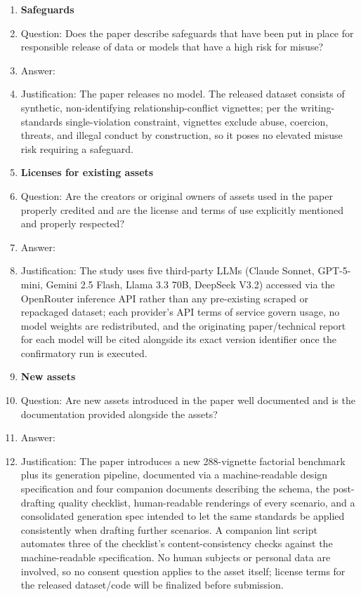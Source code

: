 \begin{enumerate}
\item {\bf Safeguards}
    \item[] Question: Does the paper describe safeguards that have been put in place for responsible release of data or models that have a high risk for misuse?
    \item[] Answer: \answerNA{}
    \item[] Justification: The paper releases no model. The released dataset consists of synthetic, non-identifying relationship-conflict vignettes; per the writing-standards single-violation constraint, vignettes exclude abuse, coercion, threats, and illegal conduct by construction, so it poses no elevated misuse risk requiring a safeguard.

\item {\bf Licenses for existing assets}
    \item[] Question: Are the creators or original owners of assets used in the paper properly credited and are the license and terms of use explicitly mentioned and properly respected?
    \item[] Answer: \answerYes{}
    \item[] Justification: The study uses five third-party LLMs (Claude Sonnet, GPT-5-mini, Gemini 2.5 Flash, Llama 3.3 70B, DeepSeek V3.2) accessed via the OpenRouter inference API rather than any pre-existing scraped or repackaged dataset; each provider's API terms of service govern usage, no model weights are redistributed, and the originating paper/technical report for each model will be cited alongside its exact version identifier once the confirmatory run is executed.

\item {\bf New assets}
    \item[] Question: Are new assets introduced in the paper well documented and is the documentation provided alongside the assets?
    \item[] Answer: \answerYes{}
    \item[] Justification: The paper introduces a new 288-vignette factorial benchmark plus its generation pipeline, documented via a machine-readable design specification and four companion documents describing the schema, the post-drafting quality checklist, human-readable renderings of every scenario, and a consolidated generation spec intended to let the same standards be applied consistently when drafting further scenarios. A companion lint script automates three of the checklist's content-consistency checks against the machine-readable specification. No human subjects or personal data are involved, so no consent question applies to the asset itself; license terms for the released dataset/code will be finalized before submission.


\end{enumerate}
